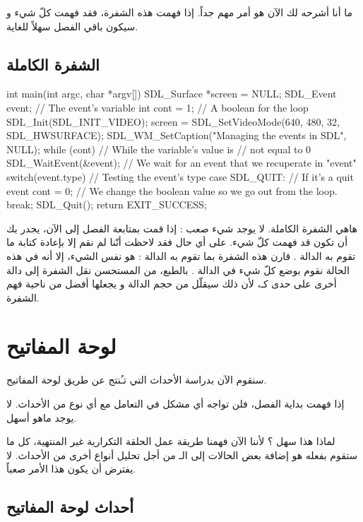 ما أنا أشرحه لك الآن هو أمر مهم جداً. إذا فهمت هذه الشفرة، فقد فهمت كلّ شيء و سيكون باقي الفصل سهلاً للغاية.

\subsection{الشفرة الكاملة}

\begin{Csource}
int main(int argc, char *argv[])
{
	SDL_Surface *screen = NULL;
	SDL_Event event; // The event's variable
	int cont = 1; // A boolean for the loop
	SDL_Init(SDL_INIT_VIDEO);
	screen = SDL_SetVideoMode(640, 480, 32, SDL_HWSURFACE);
	SDL_WM_SetCaption("Managing the events in SDL", NULL);
	while (cont) // While the variable's value is 
	{            // not equal to 0
		SDL_WaitEvent(&event); // We wait for an event that we recuperate in "event"
		switch(event.type) // Testing the event's type
		{
			case SDL_QUIT: // If it's a quit event
			cont = 0; // We change the boolean value so we go out from the loop.
			break;
		}
	}
	SDL_Quit();
	return EXIT_SUCCESS;
}
\end{Csource}

هاهي الشفرة الكاملة. لا يوجد شيء صعب : إذا قمت بمتابعة الفصل إلى الآن، يجدر بك أن تكون قد فهمت كلّ شيء. على أي حال فقد لاحظت أنّنا لم نقم إلا بإعادة كتابة ما تقوم به الدالة 
.
قارن هذه الشفرة بما تقوم به الدالة
 :
هو نفس الشيء، إلا أنه في هذه الحالة نقوم بوضع كلّ شيء في الدالة
.
بالطبع، من المستحسن نقل الشفرة إلى دالة أخرى على حدى كـ،
لأن ذلك سيقلّل من حجم الدالة
و يجعلها أفضل من ناحية فهم الشفرة.

\section{لوحة المفاتيح}

سنقوم الآن بدراسة الأحداث التي تـُنتج عن طريق لوحة المفاتيح.

إذا فهمت بداية الفصل، فلن تواجه أي مشكل في التعامل مع أي نوع من الأحداث. لا يوجد ماهو أسهل.

لماذا هذا سهل ؟ لأننا الآن فهمنا طريقة عمل الحلقة التكرارية غير المنتهية، كل ما ستقوم بفعله هو إضافة بعض الحالات إلى الـ
من أجل تحليل أنواع أخرى من الأحداث. لا يفترض أن يكون هذا الأمر صعباً.

\subsection{أحداث لوحة المفاتيح}

